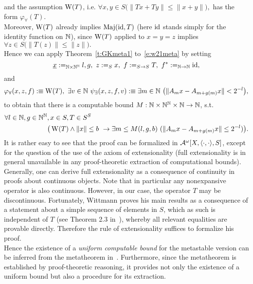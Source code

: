 and the assumption $\operatorname{W}(T)$, i.e.
$
\forall x,y\in S \big(\| Tx + Ty \| \leq \|x + y\|\big),
$
has the form $\varphi_\forall(T)$.\\
Moreover, $\operatorname{W}(T)$ already implies $\operatorname{Maj}(\operatorname{id},T)$ (here $\operatorname{id}$ stands 
simply for the identity function on $\mathbb{N}$), since $\operatorname{W}(T)$ applied to $x=y=z$
implies
$
\forall z\in S \big( \|T(z)\| \leq \|z\| \big).
$\\
Hence we can apply Theorem~\ref{t:GKmeta1} to~\eqref{e:w21meta} by setting
\[
\underline x:=_{\mathbb{N}\times\mathbb{N}^{\mathbb{N}}} l,g,
\ z:=_{S}x,
\ f:=_{S\to S}T,
\ f^*:=_{\mathbb{N}\to \mathbb{N}}\operatorname{id},
\] and
\[
\varphi_\forall(x, z, f):\equiv\TAN(T),\ 
\exists v\in\NN\ \psi_\exists(x, z, f, v):\equiv\exists m\in\NN\ \big( \|A_mx-A_{m+g(m)}x\| < 2^{-l}\big),
\]
to obtain that there is a computable bound $M:\mathbb{N}\times\mathbb{N}^{\mathbb{N}}\times\mathbb{N}\to\mathbb{N}$, s.t.
\begin{align*}
\forall l\in\mathbb{N},g\in\mathbb{N}^{\mathbb{N}}&, x\in S, T\in S^S \\
&\big( \operatorname{W}(T) \wedge \|x\| \leq b\ \rightarrow \exists m\leq M(l,g,b)\ ( \|A_mx-A_{m+g(m)}x\|\leq 2^{-l}) \big). 
\end{align*}
It is rather easy to see that the proof can be formalized in $\mathcal{A}^\omega[X,\langle\cdot,\cdot\rangle,S]$, except for the question of the use
of the axiom of extensionality (full extensionality
is in general unavailable in any proof-theoretic extraction of computational bounds). 
Generally, one can derive full extensionality as a
consequence of continuity in proofs about continuous objects.
Note that in particular any nonexpansive operator
is also continuous. However, in our case, the operator $T$ may be discontinuous. 
Fortunately, Wittmann proves his main results as a consequence of
a statement about a simple sequence of elements in $S$, 
which as such is independent of $T$ (see Theorem 2.3 in~\cite{Wittmann90}),
whereby all relevant equalities are provable directly. Therefore the rule of extensionality
suffices to formalize his proof.\\
Hence the existence of a {\em uniform computable bound} for the metastable version
can be inferred from the metatheorem in~\cite{GK08}. Furthermore, since the metatheorem is established
by proof-theoretic reasoning, it provides not only the existence of a uniform bound but also
a procedure for its extraction.\\

